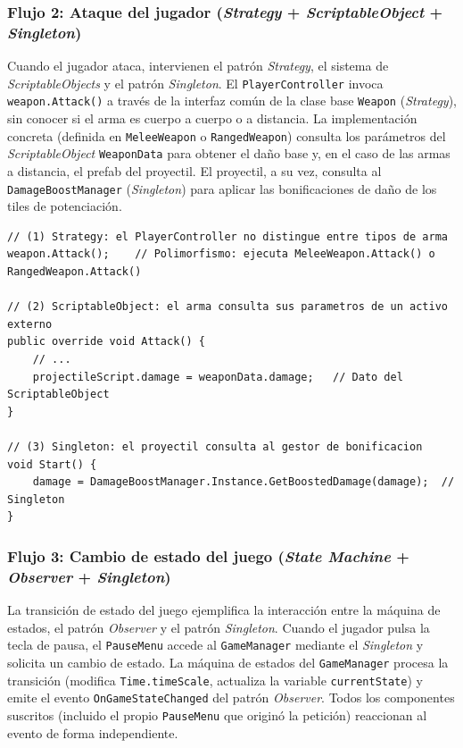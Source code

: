 \subsubsection{Flujo 2: Ataque del jugador (\textit{Strategy} + \textit{ScriptableObject} + \textit{Singleton})}


Cuando el jugador ataca, intervienen el patrón \textit{Strategy}, el sistema de \textit{ScriptableObjects} y el patrón \textit{Singleton}. El \texttt{PlayerController} invoca \texttt{weapon.Attack()} a través de la interfaz común de la clase base \texttt{Weapon} (\textit{Strategy}), sin conocer si el arma es cuerpo a cuerpo o a distancia. La implementación concreta (definida en \texttt{MeleeWeapon} o \texttt{RangedWeapon}) consulta los parámetros del \textit{ScriptableObject} \texttt{WeaponData} para obtener el daño base y, en el caso de las armas a distancia, el prefab del proyectil. El proyectil, a su vez, consulta al \texttt{DamageBoostManager} (\textit{Singleton}) para aplicar las bonificaciones de daño de los tiles de potenciación.

\begin{lstlisting}
// (1) Strategy: el PlayerController no distingue entre tipos de arma
weapon.Attack();    // Polimorfismo: ejecuta MeleeWeapon.Attack() o RangedWeapon.Attack()

// (2) ScriptableObject: el arma consulta sus parametros de un activo externo
public override void Attack() {
    // ...
    projectileScript.damage = weaponData.damage;   // Dato del ScriptableObject
}

// (3) Singleton: el proyectil consulta al gestor de bonificacion
void Start() {
    damage = DamageBoostManager.Instance.GetBoostedDamage(damage);  // Singleton
}
\end{lstlisting}


\subsubsection{Flujo 3: Cambio de estado del juego (\textit{State Machine} + \textit{Observer} + \textit{Singleton})}


La transición de estado del juego ejemplifica la interacción entre la máquina de estados, el patrón \textit{Observer} y el patrón \textit{Singleton}. Cuando el jugador pulsa la tecla de pausa, el \texttt{PauseMenu} accede al \texttt{GameManager} mediante el \textit{Singleton} y solicita un cambio de estado. La máquina de estados del \texttt{GameManager} procesa la transición (modifica \texttt{Time.timeScale}, actualiza la variable \texttt{currentState}) y emite el evento \texttt{OnGameStateChanged} del patrón \textit{Observer}. Todos los componentes suscritos (incluido el propio \texttt{PauseMenu} que originó la petición) reaccionan al evento de forma independiente.

